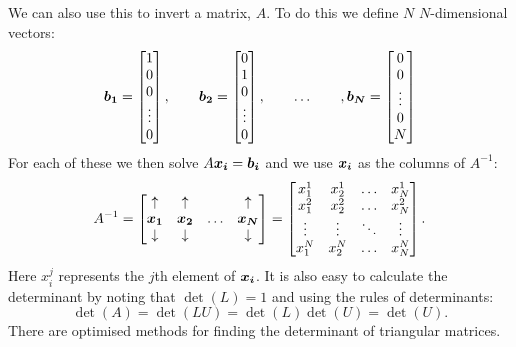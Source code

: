 \documentclass[a4paper]{article}
\begin{document}
    We can also use this to invert a matrix, \(A\).
    To do this we define \(N\) \(N\)-dimensional vectors:
    \[
        \bm{b_1} = 
        \begin{bmatrix}
            1\\ 0\\ 0\\ \vdots\\ 0
        \end{bmatrix}
        ,\qquad \bm{b_2} =
        \begin{bmatrix}
            0\\ 1\\ 0\\ \vdots\\ 0
        \end{bmatrix}
        ,\qquad\dotsc\qquad
        ,\bm{b_N} =
        \begin{bmatrix}
            0\\ 0\\ \vdots\\ 0\\ N
        \end{bmatrix}
    \]
    For each of these we then solve \(A\bm{x_i} = \bm{b_i}\) and we use \(\bm{x_i}\) as the columns of \(A^{-1}\):
    \[
        A^{-1} = 
        \begin{bmatrix}
        	\uparrow   & \uparrow   &       & \uparrow   \\
        	\bm{x_1}   & \bm{x_2}   & \dots & \bm{x_N}   \\
        	\downarrow & \downarrow &       & \downarrow
        \end{bmatrix}
        =
        \begin{bmatrix}
            x_1^1 & x_2^1 & \dots & x_N^1\\
            x_1^2 & x_2^2 & \dots & x_N^2\\
            \vdots & \vdots & \ddots & \vdots\\
            x_1^N & x_2^N & \dots & x_N^N
        \end{bmatrix}
        .
    \]
    Here \(x_i^j\) represents the \(j\)th element of \(\bm{x_i}\).
    It is also easy to calculate the determinant by noting that \(\det(L) = 1\) and using the rules of determinants:
    \[\det(A) = \det(LU) = \det(L)\det(U) = \det(U).\]
    There are optimised methods for finding the determinant of triangular matrices.
    
\end{document}
